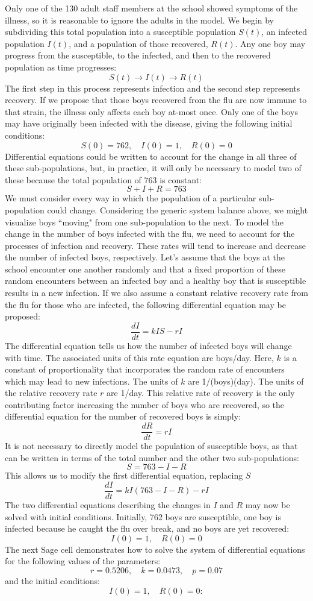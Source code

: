 \documentclass{ximera}
\begin{document}
Only one of the 130 adult staff members at the school showed symptoms of the illness, so it is reasonable to ignore the adults in the model.  We begin by subdividing this total population into a susceptible population $S(t)$, an infected population $I(t)$, and a population of those recovered, $R(t)$.  Any one boy may progress from the susceptible, to the infected, and then to the recovered population as time progresses:
$$S(t)\longrightarrow I(t)\longrightarrow R(t)$$
The first step in this process represents infection and the second step represents recovery.  If we propose that those boys recovered from the flu are now immune to that strain, the illness only affects each boy at-most once.  Only one of the boys may have originally been infected with the disease, giving the following initial conditions:
$$S(0)=762,\quad I(0)=1,\quad R(0)=0$$
Differential equations could be written to account for the change in all three of these sub-populations, but, in practice, it will only be necessary to model two of these because the total population of 763 is constant:
$$S+I+R=763$$
We must consider every way in which the population of a particular sub-population could change.  Considering the generic system balance above, we might visualize boys ``moving" from one sub-population to the next.  To model the change in the number of boys infected with the flu, we need to account for the processes of infection and recovery.  These rates will tend to increase and decrease the number of infected boys, respectively.  Let's assume that the boys at the school encounter one another randomly and that a fixed proportion of these random encounters between an infected boy and a healthy boy that is susceptible results in a new infection.  If we also assume a constant relative recovery rate from the flu for those who are infected, the following differential equation may be proposed:
$$\frac{dI}{dt}=kIS-rI $$
The differential equation tells us how the number of infected boys will change with time.  The associated units of this rate equation are boys/day.  Here, $k$ is a constant of proportionality that incorporates the random rate of encounters which may lead to new infections.  The units of $k$ are 1/(boys)(day).  The units of the relative recovery rate $r$ are 1/day.  This relative rate of recovery is the only contributing factor increasing the number of boys who are recovered, so the differential equation for the number of recovered boys is simply:
$$\frac{dR}{dt}=rI $$
It is not necessary to directly model the population of susceptible boys, as that can be written in terms of the total number and the other two sub-populations:
$$S=763-I-R$$
This allows us to modify the first differential equation, replacing $S$
$$\frac{dI}{dt}=kI(763-I-R)-rI$$
The two differential equations describing the changes in $I$ and $R$ may now be solved with initial conditions.  Initially, 762 boys are susceptible, one boy is infected because he caught the flu over break, and no boys are yet recovered:
$$I(0)=1,\quad R(0)=0$$
The next Sage cell demonstrates how to solve the system of differential equations for the following values of the parameters:
\[
r = 0.5206,\quad k = 0.0473,\quad p = 0.07
\]
and the initial conditions:
\[
I(0)=1,\quad R(0)=0:
\]
 
\end{document}
